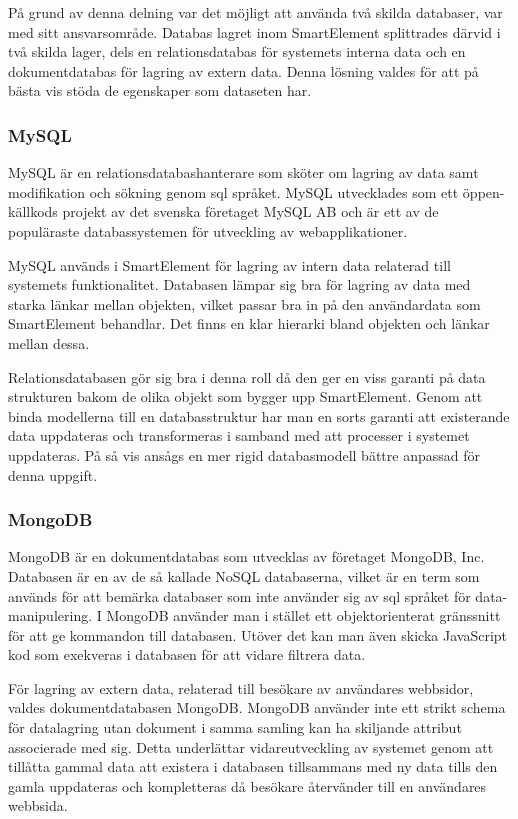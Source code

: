 På grund av denna delning var det möjligt att använda två skilda databaser, var med sitt ansvarsområde. Databas lagret inom SmartElement splittrades därvid i två skilda lager, dels en relationsdatabas för systemets interna data och en dokumentdatabas för lagring av extern data. Denna lösning valdes för att på bästa vis stöda de egenskaper som dataseten har.

\subsubsection{MySQL}

MySQL är en relationsdatabashanterare som sköter om lagring av data samt modifikation och sökning genom \gls{sql} språket. MySQL utvecklades som ett öppen-källkods projekt av det svenska företaget MySQL AB och är ett av de populäraste databassystemen för utveckling av webapplikationer. \citep{dbengines}

MySQL används i SmartElement för lagring av intern data relaterad till systemets funktionalitet. Databasen lämpar sig bra för lagring av data med starka länkar mellan objekten, vilket passar bra in på den användardata som SmartElement behandlar. Det finns en klar hierarki bland objekten och länkar mellan dessa.

Relationsdatabasen gör sig bra i denna roll då den ger en viss garanti på data strukturen bakom de olika objekt som bygger upp SmartElement. Genom att binda modellerna till en databasstruktur har man en sorts garanti att existerande data uppdateras och transformeras i samband med att processer i systemet uppdateras. På så vis ansågs en mer rigid databasmodell bättre anpassad för denna uppgift.

\subsubsection{MongoDB}

MongoDB är en dokumentdatabas som utvecklas av företaget MongoDB, Inc. Databasen är en av de så kallade NoSQL databaserna, vilket är en term som används för att bemärka databaser som inte använder sig av \gls{sql} språket för data-manipulering. I MongoDB använder man i stället ett objektorienterat gränssnitt för att ge kommandon till databasen. Utöver det kan man även skicka JavaScript kod som exekveras i databasen för att vidare filtrera data. \citep{mongoquery}

För lagring av extern data, relaterad till besökare av användares webbsidor, valdes dokumentdatabasen MongoDB. MongoDB använder inte ett strikt schema för datalagring utan dokument i samma samling kan ha skiljande attribut associerade med sig. Detta underlättar vidareutveckling av systemet genom att tillåtta gammal data att existera i databasen tillsammans med ny data tills den gamla uppdateras och kompletteras då besökare återvänder till en användares webbsida.

